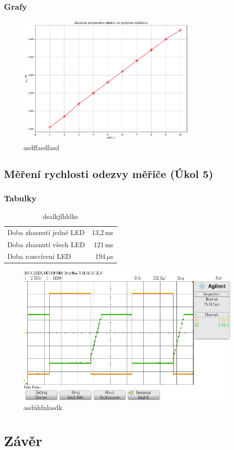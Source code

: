 \documentclass[a4paper, czech]{article}
\begin{document}
\subsubsection{Grafy}

\begin{figure}[H]
    \centering
    \includegraphics[width=0.8\textwidth]{grafy/graf3.pdf}
    \caption{asdffasdfasd}
\end{figure}

\subsection{Měření rychlosti odezvy měřiče (Úkol 5)}

\subsubsection{Tabulky}

\begin{table}[H]
    \centering
    \caption{dsalkjfhldks}
    \begin{tabular}{lr}
        \toprule
        Doba zhasnutí jedné LED & 13,2\,ms \\
        Doba zhasnutí všech LED & 121\,ms \\
        Doba rozsvícení LED & 194\,$\mu$s \\
        \bottomrule
    \end{tabular}
\end{table}

\begin{figure}[H]
    \centering
    \includegraphics[width=\textwidth]{osciloskop_uloha8.png}
    \caption{asdůhfnlasdk}
\end{figure}

\section{Závěr}
\end{document}
